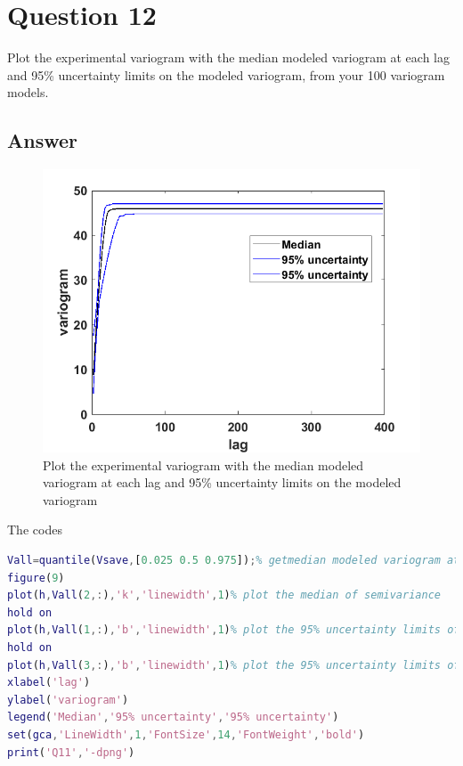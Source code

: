 \documentclass[
	12pt, %
]{fphw}
\begin{document}
 \section*{Question 12 }

\begin{problem}
Plot the experimental variogram with the median modeled variogram at each lag and 95\%
uncertainty limits on the modeled variogram, from your 100 variogram models.	
\end{problem}

\subsection*{Answer}

 \begin{figure}[htbp]
	\centering
	\includegraphics[width=0.8\columnwidth]{Q11.png} 
	\caption{Plot the experimental variogram with the median modeled variogram at each lag and 95\%
		uncertainty limits on the modeled variogram }
\end{figure}

The codes

\begin{lstlisting}[language=Matlab,escapeinside=``]
Vall=quantile(Vsave,[0.025 0.5 0.975]);% getmedian modeled variogram at each lag and 95% uncertainty limits
figure(9)
plot(h,Vall(2,:),'k','linewidth',1)% plot the median of semivariance 
hold on
plot(h,Vall(1,:),'b','linewidth',1)% plot the 95% uncertainty limits of semivariance
hold on
plot(h,Vall(3,:),'b','linewidth',1)% plot the 95% uncertainty limits of semivariance 
xlabel('lag')
ylabel('variogram')
legend('Median','95% uncertainty','95% uncertainty')
set(gca,'LineWidth',1,'FontSize',14,'FontWeight','bold')
print('Q11','-dpng')
\end{lstlisting}
\end{document}
